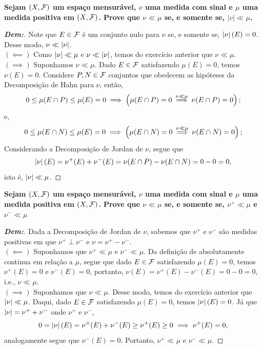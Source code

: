 \textbf{Sejam $(X, \mathcal F)$ um espaço mensurável, $\nu$ uma medida com sinal 
e $\mu$ uma medida positiva em $(X, \mathcal F)$. Prove que $\nu \ll \mu$
se, e somente se, $|v| \ll \mu$.}
\begin{proof}[\textbf{Dem:}] Note que $E \in \mathcal F$ é um 
  conjunto nulo para $\nu$ se, e somente se, $\left|\nu\right| (E) = 0$. Desse modo, 
  $\nu \ll \left|\nu\right|$. \\
  $(\impliedby)$ Como $\left|\nu\right| \ll \mu$ e $\nu \ll \left|\nu\right|$, temos do 
  exercício anterior que $\nu \ll \mu$. \\
  $(\implies)$ Suponhamos $\nu \ll \mu$. Dado $E \in  \mathcal F$ satisfazendo 
  $\mu(E)=0$, temos $\nu(E) = 0$. Considere $P, N \in \mathcal F$ conjuntos
  que obedecem as hipóteses da Decomposição de Hahn para $\nu$, então, 
  \begin{align*}
    0\le \mu(E\cap P) \le \mu(E) = 0 \implies \left(\mu(E\cap P) = 0 
    \overset{\nu \ll \mu}{\implies} \nu(E\cap P) = 0\right);
  \end{align*}
  e, 
  \begin{align*}
    0\le \mu(E\cap N) \le \mu(E) = 0 \implies \left(\mu(E\cap N) = 0 
    \overset{\nu \ll \mu}{\implies} \nu(E\cap N) = 0\right);
  \end{align*}
  Considerando a Decomposição de Jordan de $\nu$, segue que 
  \begin{align*}
    \left|\nu\right| (E) = \nu^+(E) + \nu^-(E) = \nu(E\cap P) - \nu(E\cap N)
    = 0 - 0 = 0,
  \end{align*}
  isto é, $\left|\nu\right| \ll \mu$.
\end{proof}

\textbf{Sejam $(X, \mathcal F)$ um espaço mensurável, $\nu$ uma medida com sinal e $\mu$ 
uma medida positiva em $(X,\mathcal F)$. Prove que $\nu \ll \mu$
se, e somente se, $\nu^+ \ll \mu$ e $\nu^- \ll \mu$}
\begin{proof}[\textbf{Dem:}] Dada a Decomposição de Jordan de $\nu$, 
  sabemos que $\nu^+$ e $\nu^-$ são medidas positivas em que $\nu^+ \perp \nu^-$
  e $\nu = \nu^+ - \nu^-$. \\
  $(\impliedby)$ Suponhamos que $\nu^+\ll \mu$ e $\nu^-\ll \mu$. Da definição 
  de absolutamente continua em relação a $\mu$, segue que dado $E \in \mathcal F$ 
  satisfazendo $\mu(E) = 0$, temos $\nu^+(E) = 0$ e $\nu^-(E) = 0$, portanto,
  $\nu(E) = \nu^+(E) - \nu^-(E) = 0 - 0 = 0$, i.e., $\nu \ll \mu$.\\
  $(\implies)$ Suponhamos que $\nu \ll \mu$. Desse modo, 
  temos do exercício anterior que $\left|\nu\right| \ll \mu$. Daqui, 
  dado $E \in \mathcal F$ satisfazendo $\mu(E) = 0$, temos $\left|\nu\right|(E) = 0$. 
  Já que $\left|\nu\right| = \nu^+ + \nu^-$ onde $\nu^+$ e $\nu^-$, 
  \begin{align*}
    0 = \left|\nu\right|(E) = \nu^+(E) + \nu^-(E) \ge \nu^+(E) \ge 0 \implies \nu^+(E) = 0,
  \end{align*}
    analogamente segue que $\nu^-(E) = 0$. Portanto, 
    $\nu^+ \ll \mu$ e $\nu^- \ll \mu$.
\end{proof}

